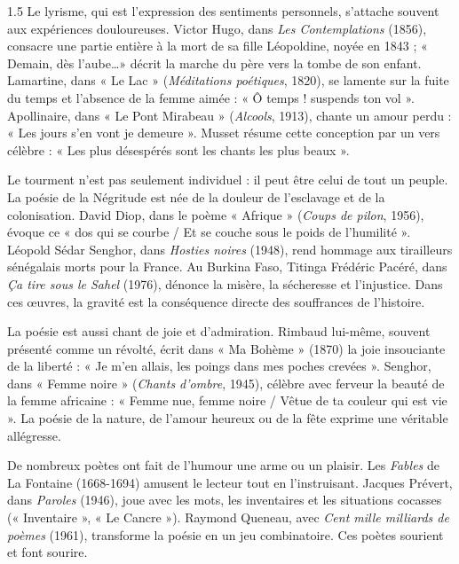 \documentclass[12pt]{article}
\begin{document}
\begin{spacing}{1.5}
Le lyrisme, qui est l'expression des sentiments personnels, s'attache souvent aux expériences douloureuses. Victor Hugo, dans \emph{Les Contemplations} (1856), consacre une partie entière à la mort de sa fille Léopoldine, noyée en 1843 ; « Demain, dès l'aube\dots » décrit la marche du père vers la tombe de son enfant. Lamartine, dans « Le Lac » (\emph{Méditations poétiques}, 1820), se lamente sur la fuite du temps et l'absence de la femme aimée : « Ô temps ! suspends ton vol ». Apollinaire, dans « Le Pont Mirabeau » (\emph{Alcools}, 1913), chante un amour perdu : « Les jours s'en vont je demeure ». Musset résume cette conception par un vers célèbre : « Les plus désespérés sont les chants les plus beaux ».

Le tourment n'est pas seulement individuel : il peut être celui de tout un peuple. La poésie de la Négritude est née de la douleur de l'esclavage et de la colonisation. David Diop, dans le poème « Afrique » (\emph{Coups de pilon}, 1956), évoque ce « dos qui se courbe / Et se couche sous le poids de l'humilité ». Léopold Sédar Senghor, dans \emph{Hosties noires} (1948), rend hommage aux tirailleurs sénégalais morts pour la France. Au Burkina Faso, Titinga Frédéric Pacéré, dans \emph{Ça tire sous le Sahel} (1976), dénonce la misère, la sécheresse et l'injustice. Dans ces œuvres, la gravité est la conséquence directe des souffrances de l'histoire.



La poésie est aussi chant de joie et d'admiration. Rimbaud lui-même, souvent présenté comme un révolté, écrit dans « Ma Bohème » (1870) la joie insouciante de la liberté : « Je m'en allais, les poings dans mes poches crevées ». Senghor, dans « Femme noire » (\emph{Chants d'ombre}, 1945), célèbre avec ferveur la beauté de la femme africaine : « Femme nue, femme noire / Vêtue de ta couleur qui est vie ». La poésie de la nature, de l'amour heureux ou de la fête exprime une véritable allégresse.

De nombreux poètes ont fait de l'humour une arme ou un plaisir. Les \emph{Fables} de La Fontaine (1668-1694) amusent le lecteur tout en l'instruisant. Jacques Prévert, dans \emph{Paroles} (1946), joue avec les mots, les inventaires et les situations cocasses (« Inventaire », « Le Cancre »). Raymond Queneau, avec \emph{Cent mille milliards de poèmes} (1961), transforme la poésie en un jeu combinatoire. Ces poètes sourient et font sourire.


\end{spacing}
\end{document}
